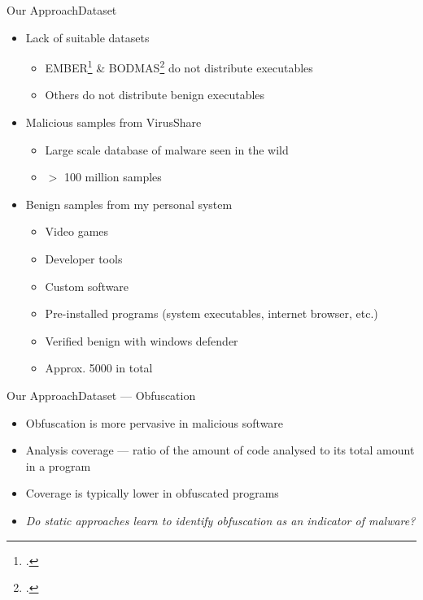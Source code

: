\documentclass[xcolor={dvipsnames},t,aspectratio=169]{beamer}
\begin{document}
\begin{frame}{Our Approach}{Dataset}
    \begin{itemize}
        \item Lack of suitable datasets 
        \begin{itemize}
            \item EMBER\footcite{andersonEMBEROpenDataset2018} \& BODMAS\footcite{yangBODMASOpenDataset2021} do not distribute executables
            \item Others do not distribute benign executables
        \end{itemize}
        \item Malicious samples from VirusShare 

        \begin{itemize}
            \item Large scale database of malware seen in the wild 
            \item $>$ 100 million samples
        \end{itemize}

        \item Benign samples from my personal system 

        \begin{itemize}
            \item Video games 
            \item Developer tools 
            \item Custom software 
            \item Pre-installed programs (system executables, internet browser, etc.)
            \item Verified benign with windows defender
            \item Approx. 5000 in total
        \end{itemize}
    \end{itemize}    
\end{frame}

\begin{frame}{Our Approach}{Dataset --- Obfuscation}
    \begin{itemize}
        \item Obfuscation is more pervasive in malicious software 
        \item Analysis coverage --- ratio of the amount of code analysed to its total amount in a program 
        \item Coverage is typically lower in obfuscated programs
        \item \emph{Do static approaches learn to identify obfuscation as an indicator of malware?}
    \end{itemize}
\end{frame}
\end{document}
